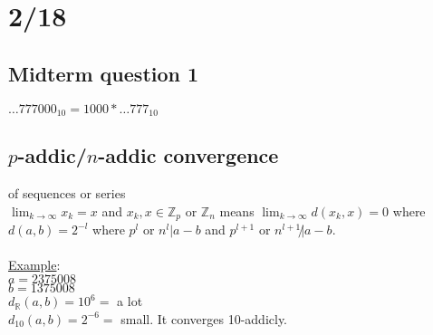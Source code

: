\section*{2/18}
  \subsection*{Midterm question 1}
    $\ldots 777000_{10} = 1000 * \ldots 777_{10}$\\
  \subsection*{$p$-addic/$n$-addic convergence}
    of sequences or series\\
    $\lim_{k \to \infty} x_k = x$ and $x_k, x \in \mathbb{Z}_p$ or 
    $\mathbb{Z}_n$ means $\lim_{k \to \infty} d(x_k, x) = 0$ where
    $d(a,b) = 2^{-l}$ where $p^l$ or $n^l | a - b$ and $p^{l + 1}$ or
    $n^{l + 1} \not| a - b$.\\\\
  \underline{Example}:\\
    $a = 2375008$\\
    $b = 1375008$\\
    $d_{\mathbb{R}}(a,b)= 10^6 = $ a lot\\
    $d_{10}(a,b) = 2^{-6} = $ small. It converges 10-addicly.\\
